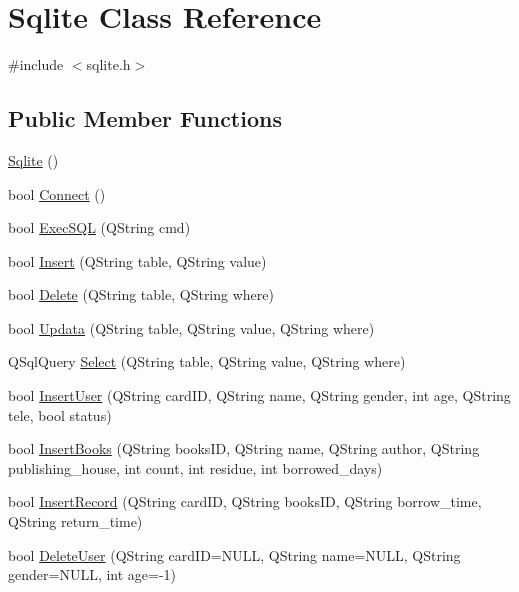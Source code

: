 \hypertarget{class_sqlite}{}\section{Sqlite Class Reference}
\label{class_sqlite}


{\ttfamily \#include $<$sqlite.\+h$>$}

\subsection*{Public Member Functions}
\begin{DoxyCompactItemize}
\item 
\mbox{\hyperlink{class_sqlite_a8aef4e64531e1522f892c0c6ec69cdff}{Sqlite}} ()
\item 
bool \mbox{\hyperlink{class_sqlite_aa93509c1e19a7d486f4f38ff4bc78a89}{Connect}} ()
\item 
bool \mbox{\hyperlink{class_sqlite_a3d4be952cdb19b674a80dacd78e2873a}{Exec\+S\+QL}} (Q\+String cmd)
\item 
bool \mbox{\hyperlink{class_sqlite_a8d0c32df6db2b0ca13695cfa8780840e}{Insert}} (Q\+String table, Q\+String value)
\item 
bool \mbox{\hyperlink{class_sqlite_a772711beeceff7a567192e19abccfed4}{Delete}} (Q\+String table, Q\+String where)
\item 
bool \mbox{\hyperlink{class_sqlite_ae014031d1e0b0d9c412fb72ddc5a0043}{Updata}} (Q\+String table, Q\+String value, Q\+String where)
\item 
Q\+Sql\+Query \mbox{\hyperlink{class_sqlite_a9a39cca147a504c82e98261707aa1e8d}{Select}} (Q\+String table, Q\+String value, Q\+String where)
\item 
bool \mbox{\hyperlink{class_sqlite_aaaa7d53dd288728640cde95e264f31f1}{Insert\+User}} (Q\+String card\+ID, Q\+String name, Q\+String gender, int age, Q\+String tele, bool status)
\item 
bool \mbox{\hyperlink{class_sqlite_a51b44b9e10f90888b36088adb6ec6226}{Insert\+Books}} (Q\+String books\+ID, Q\+String name, Q\+String author, Q\+String publishing\+\_\+house, int count, int residue, int borrowed\+\_\+days)
\item 
bool \mbox{\hyperlink{class_sqlite_a7271bf0e8252a9dc0969872faea228b4}{Insert\+Record}} (Q\+String card\+ID, Q\+String books\+ID, Q\+String borrow\+\_\+time, Q\+String return\+\_\+time)
\item 
bool \mbox{\hyperlink{class_sqlite_af2b581d800d01e1f1281d98ec1341ddd}{Delete\+User}} (Q\+String card\+ID=N\+U\+LL, Q\+String name=N\+U\+LL, Q\+String gender=N\+U\+LL, int age=-\/1)

\end{DoxyCompactItemize}
